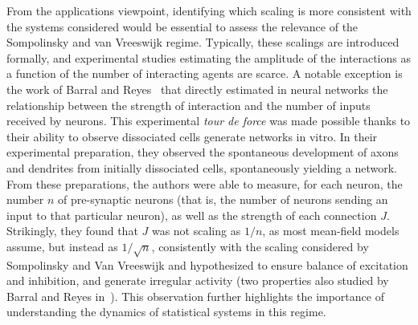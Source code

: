 \documentclass[onefignum,onetabnum]{siamart190516}
\newcommand{\1}{\mathbbm{1}}
\newcommand{\minor}[1]{\textcolor{orange}{ #1}}
\renewcommand{\minor}[1]{{ #1}}
\begin{document}
\minor{From the applications viewpoint, identifying which scaling is more consistent with the systems considered would be essential to assess the relevance of the Sompolinsky and van Vreeswijk regime. Typically, these scalings are introduced formally, and experimental studies estimating the amplitude of the interactions as a function of the number of interacting agents are scarce. A notable exception is the work of Barral and Reyes~\cite{barral2016synaptic} that directly estimated in neural networks the relationship between the strength of interaction and the number of inputs received by neurons. This experimental \emph{tour de force} was made possible thanks to their ability to observe dissociated cells generate networks in vitro. In their experimental preparation, they observed the spontaneous development of axons and dendrites from initially dissociated cells, spontaneously yielding a network. From these preparations, the authors were able to measure, for each neuron, the number $n$ of pre-synaptic neurons (that is, the number of neurons sending an input to that particular neuron), as well as the strength of each connection $J$. Strikingly, they found that $J$ was not scaling as $1/n$, as most mean-field models assume, but instead as $1/\sqrt{n}$, consistently with the scaling considered by Sompolinsky and Van Vreeswijk and hypothesized to ensure balance of excitation and inhibition, and generate irregular activity (two properties also studied by Barral and Reyes in~\cite{barral2016synaptic}). This observation further highlights the importance of understanding the dynamics of statistical systems in this regime. }
\end{document}
